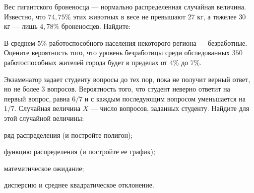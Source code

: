 \vfil

\begin{zkrPlain}{25}\noindent 
	Вес гигантского броненосца — нормально распределенная случайная величина. Известно, что $74{,}75\%$ этих животных в весе не превышают $27$ кг, а тяжелее $30$ кг — лишь $4{,}78\%$ броненосцев. Найдите: \par {}
 
\end{zkrPlain}

\vfil

\begin{zkrPlain}{25}\noindent 
	В среднем $ 5 \% $ работоспособного населения некоторого региона --- безработные. Оцените вероятность того, что уровень безработицы среди обследованных $ 350 $ работоспособных жителей города будет в пределах от $ 4 \% $ до $ 7 \% $.
 
\end{zkrPlain}

\newpage\setcounter{zad}{0}\setcounter{footnote}{0}



\begin{zkrPlain}{25}\noindent 
	Экзаменатор задает студенту вопросы до тех пор, пока не получит верный ответ, но не более 3 вопросов. Вероятность того, что студент неверно ответит на первый вопрос, равна $6/7$ и с каждым последующим вопросом уменьшается на $1/7$. Случайная величина $X$ --- число вопросов, заданных студенту.  Найдите для этой случайной величины: \par \smallskip\small{ \par \zz ряд распределения (и постройте полигон); \par \zz функцию распределения (и постройте ее график); \par \zz математическое ожидание; \par \zz дисперсию и среднее квадратическое отклонение.\par \par}
 
\end{zkrPlain}

\vfil

